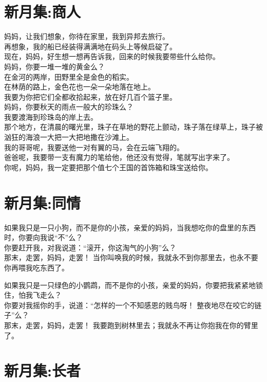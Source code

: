 \documentclass[]{book}
\renewenvironment{quote}{\begin{VF}}{\end{VF}}
\begin{document}
\section{新月集:商人}

\begin{quote}
妈妈，让我们想象，你待在家里，我到异邦去旅行。\\
再想象，我的船已经装得满满地在码头上等候启碇了。\\
现在，妈妈，好生想一想再告诉我，回来的时候我要带些什么给你。\\
妈妈，你要一堆一堆的黄金么？\\
在金河的两岸，田野里全是金色的稻实。\\
在林荫的路上，金色花也一朵一朵地落在地上。\\
我要为你把它们全都收拾起来，放在好几百个篮子里。\\
妈妈，你要秋天的雨点一般大的珍珠么？\\
我要渡海到珍珠岛的岸上去。\\
那个地方，在清晨的曙光里，珠子在草地的野花上颤动，珠子落在绿草上，珠子被汹狂的海浪一大把一大把地撒在沙滩上。\\
我的哥哥呢，我要送他一对有翼的马，会在云端飞翔的。\\
爸爸呢，我要带一支有魔力的笔给他，他还没有觉得，笔就写出字来了。\\
你呢，妈妈，我一定要把那个值七个王国的首饰箱和珠宝送给你。
\end{quote}

\section{新月集:同情}

\begin{quote}
如果我只是一只小狗，而不是你的小孩，亲爱的妈妈，当我想吃你的盘里的东西时，你要向我说``不''么？\\
你要赶开我，对我说道：``滚开，你这淘气的小狗''么？\\
那末，走罢，妈妈，走罢！
当你叫唤我的时候，我就永不到你那里去，也永不要你再喂我吃东西了。

如果我只是一只绿色的小鹦鹉，而不是你的小孩，亲爱的妈妈，你要把我紧紧地锁住，怕我飞走么？\\
你要对我摇你的手，说道：``怎样的一个不知感恩的贱鸟呀！
整夜地尽在咬它的链子''么？\\
那末，走罢，妈妈，走罢！
我要跑到树林里去；我就永不再让你抱我在你的臂里了。
\end{quote}

\section{新月集:长者}
\end{document}
